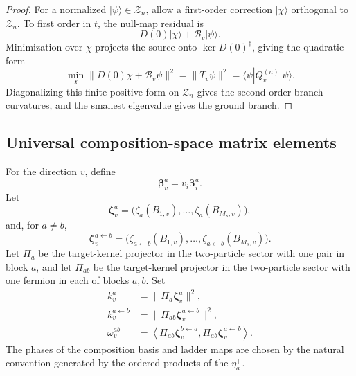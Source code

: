 \documentclass[11pt]{article}
\numberwithin{equation}{section}
\newcommand{\cZ}{\mathcal Z}
\newcommand{\cB}{\mathcal B}
\newcommand{\bbeta}{\boldsymbol\beta}
\newcommand{\bzeta}{\boldsymbol\zeta}
\begin{document}
\begin{proof}
For a normalized $|\psi\rangle\in\cZ_n$, allow a first-order correction $|\chi\rangle$ orthogonal to $\cZ_n$.  To first order in $t$, the null-map residual is
\begin{equation}
 D(0)|\chi\rangle+\cB_v|\psi\rangle.
 \label{eq:degenerate-residual}
\end{equation}
Minimization over $\chi$ projects the source onto $\ker D(0)^\dagger$, giving the quadratic form
\begin{equation}
 \min_\chi\|D(0)\chi+\cB_v\psi\|^2
 =\|T_v\psi\|^2
 =\langle\psi|Q_v^{(n)}|\psi\rangle.
 \label{eq:degenerate-min}
\end{equation}
Diagonalizing this finite positive form on $\cZ_n$ gives the second-order branch curvatures, and the smallest eigenvalue gives the ground branch.
\end{proof}

\subsection{Universal composition-space matrix elements}

For the direction $v$, define
\begin{equation}
 \bbeta_v^a=v_i\bbeta_i^a.
 \label{eq:beta-v}
\end{equation}
Let
\begin{equation}
 \bzeta_v^a
 =\bigl(\zeta_a(B_{1,v}),\ldots,\zeta_a(B_{M_s,v})\bigr),
 \label{eq:zeta-v-a}
\end{equation}
and, for $a\ne b$,
\begin{equation}
 \bzeta_v^{a\leftarrow b}
 =\bigl(\zeta_{a\leftarrow b}(B_{1,v}),\ldots,
 \zeta_{a\leftarrow b}(B_{M_s,v})\bigr).
 \label{eq:zeta-v-transfer}
\end{equation}
Let $\Pi_a$ be the target-kernel projector in the two-particle sector with one pair in block $a$, and let $\Pi_{ab}$ be the target-kernel projector in the two-particle sector with one fermion in each of blocks $a,b$.  Set
\begin{align}
 k_v^a&=\|\Pi_a\bzeta_v^a\|^2,
 \label{eq:k-a}\\
 k_v^{a\leftarrow b}&=\|\Pi_{ab}\bzeta_v^{a\leftarrow b}\|^2,
 \label{eq:k-transfer}\\
 \omega_v^{ab}&=
 \left\langle
 \Pi_{ab}\bzeta_v^{b\leftarrow a},
 \Pi_{ab}\bzeta_v^{a\leftarrow b}
 \right\rangle.
 \label{eq:omega}
\end{align}
The phases of the composition basis and ladder maps are chosen by the natural convention generated by the ordered products of the $\eta_a^+$.
\end{document}
